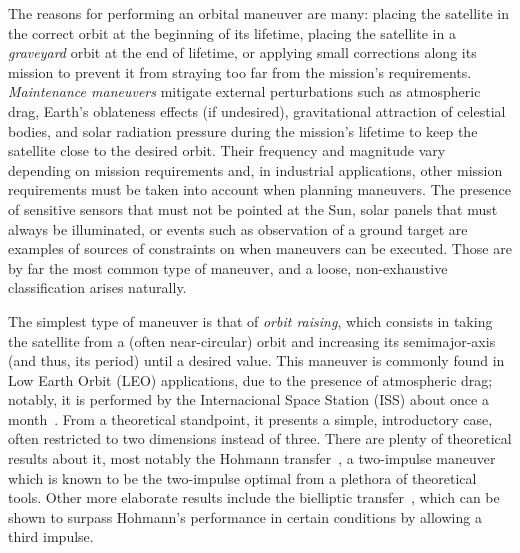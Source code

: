 The reasons for performing an orbital maneuver are many: placing the satellite in the correct orbit at the beginning of its lifetime, placing the satellite in a \textit{graveyard} orbit at the end of lifetime, or applying small corrections along its mission to prevent it from straying too far from the mission's requirements. \textit{Maintenance maneuvers} mitigate external perturbations such as atmospheric drag, Earth's oblateness effects (if undesired), gravitational attraction of celestial bodies, and solar radiation pressure during the mission's lifetime to keep the satellite close to the desired orbit. Their frequency and magnitude vary depending on mission requirements and, in industrial applications, other mission requirements must be taken into account when planning maneuvers. The presence of sensitive sensors that must not be pointed at the Sun, solar panels that must always be illuminated, or events such as observation of a ground target are examples of sources of constraints on when maneuvers can be executed. Those are by far the most common type of maneuver, and a loose, non-exhaustive classification arises naturally.

The simplest type of maneuver is that of \textit{orbit raising}, which consists in taking the satellite from a (often near-circular) orbit and increasing its semimajor-axis (and thus, its period) until a desired value. This maneuver is commonly found in Low Earth Orbit (LEO) applications, due to the presence of atmospheric drag; notably, it is performed by the Internacional Space Station (ISS) about once a month~\cite{iss_reboost}\@. From a theoretical standpoint, it presents a simple, introductory case, often restricted to two dimensions instead of three. There are plenty of theoretical results about it, most notably the Hohmann transfer~\cite{chobotov}, a two-impulse maneuver which is known to be the two-impulse optimal from a plethora of theoretical tools. Other more elaborate results include the bielliptic transfer~\cite{chobotov}, which can be shown to surpass Hohmann's performance in certain conditions by allowing a third impulse.


